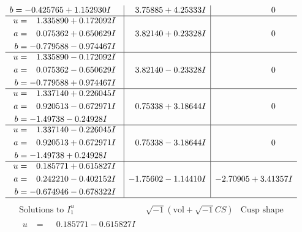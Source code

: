 \documentclass[1p]{elsarticle_modified}
\theoremstyle{definition}
\newcommand{\I}{\sqrt{-1}}
\begin{document}
$$\begin{array}{c|c|c}
\begin{aligned}
b &= -0.425765 + 1.152930 I\end{aligned}
 & \phantom{-}3.75885 + 4.25333 I & \phantom{-0.000000 } 0 \\ \hline\begin{aligned}
u &= \phantom{-}1.335890 + 0.172092 I \\
a &= \phantom{-}0.075362 + 0.650629 I \\
b &= -0.779588 - 0.974467 I\end{aligned}
 & \phantom{-}3.82140 + 0.23328 I & \phantom{-0.000000 } 0 \\ \hline\begin{aligned}
u &= \phantom{-}1.335890 - 0.172092 I \\
a &= \phantom{-}0.075362 - 0.650629 I \\
b &= -0.779588 + 0.974467 I\end{aligned}
 & \phantom{-}3.82140 - 0.23328 I & \phantom{-0.000000 } 0 \\ \hline\begin{aligned}
u &= \phantom{-}1.337140 + 0.226045 I \\
a &= \phantom{-}0.920513 - 0.672971 I \\
b &= -1.49738 - 0.24928 I\end{aligned}
 & \phantom{-}0.75338 + 3.18644 I & \phantom{-0.000000 } 0 \\ \hline\begin{aligned}
u &= \phantom{-}1.337140 - 0.226045 I \\
a &= \phantom{-}0.920513 + 0.672971 I \\
b &= -1.49738 + 0.24928 I\end{aligned}
 & \phantom{-}0.75338 - 3.18644 I & \phantom{-0.000000 } 0 \\ \hline\begin{aligned}
u &= \phantom{-}0.185771 + 0.615827 I \\
a &= \phantom{-}0.242210 - 0.402152 I \\
b &= -0.674946 - 0.678322 I\end{aligned}
 & -1.75602 - 1.14410 I & -2.70905 + 3.41357 I\\
 \hline 
 \end{array}$$\newpage$$\begin{array}{c|c|c}  
\text{Solutions to }I^u_{1}& \I (\text{vol} + \sqrt{-1}CS) & \text{Cusp shape}\\
 \hline 
\begin{aligned}
u &= \phantom{-}0.185771 - 0.615827 I \\

\end{aligned}
\end{array}$$
\end{document}

